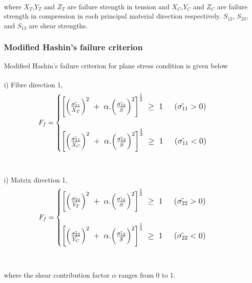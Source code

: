 \documentclass[a4paper,12pt]{extarticle}
\begin{document}
\\
\\
\\
where $X_{T}$,$ Y_{T} $ and $Z_{T}$ are failure strength in tension and $X_{C}$,$ Y_{C} $ and $Z_{C}$ are failure strength in compression in each principal material direction respectively. $S_{12}$, $S_{23}$, and $S_{13}$ are shear strengths.
\subsubsection{Modified Hashin's failure criterion }
\indent\indent\indent Modified Hashin's failure criterion for plane stress condition is given below
\\
\\
i) Fibre direction 1,
\\
\begin{equation}
\large{F_{f} =  
	\begin{cases}
	
		\left[ \Big(\frac{\tilde{\sigma_{11}}} {X_{T}}\Big)^{2} \; + \;\alpha . \Big(\frac{\tilde{\sigma_{12}}}{S}\Big)^{2}\right]^{\frac{1}{2}} \;  \geq  \; 1  \; \; \; \; \;  (\tilde{\sigma_{11}}  >  0)  \\
	\\
\left[ \Big(\frac{\tilde{\sigma_{11}}} {X_{C}}\Big)^{2} \; + \;\alpha . \Big(\frac{\tilde{\sigma_{12}}}{S}\Big)^{2}\right]^{\frac{1}{2}} \;  \geq  \; 1  \; \; \; \; \;  (\tilde{\sigma_{11}}  <  0)
	
	\end{cases}}
\end{equation}
\\
\\
i) Matrix direction 1,
\\
\begin{equation}
\large{F_{f} =  
	\begin{cases}
	
	\left[ 	\Big(\frac{\tilde{\sigma_{22}}} {Y_{T}}\Big)^{2} \; + \;\alpha . \Big(\frac{\tilde{\sigma_{12}}}{S}\Big)^{2} \right]^{\frac{1}{2}} \;  \geq  \; 1  \; \; \; \; \;  (\tilde{\sigma_{22}}  >  0)  \\
	\\
\left[ \Big(\frac{\tilde{\sigma_{22}}} {Y_{C}}\Big)^{2} \; + \;\alpha . \Big(\frac{\tilde{\sigma_{12}}}{S}\Big)^{2}\right]^{\frac{1}{2}} \;  \geq  \; 1  \; \; \; \; \;  (\tilde{\sigma_{22}}  <  0)
	
	\end{cases}}
\end{equation}
\\
\\
where the shear contribution factor $\alpha$ ranges from 0 to 1.
\newpage
\end{document}
